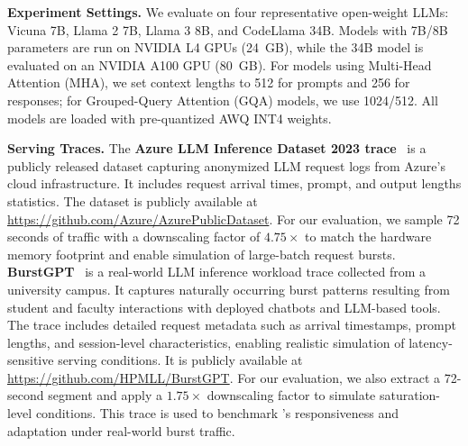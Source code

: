 \noindent\textbf{Experiment Settings.} 
We evaluate {\system} on four representative open-weight LLMs: Vicuna 7B, Llama 2 7B, Llama 3 8B, and CodeLlama 34B. Models with 7B/8B parameters are run on NVIDIA L4 GPUs (24~GB),
while the 34B model is evaluated on an NVIDIA A100 GPU (80~GB). For models using Multi-Head Attention (MHA), we set context lengths to 512 for prompts and 256 for responses; for Grouped-Query Attention (GQA) models, we use 1024/512. All models are loaded with pre-quantized AWQ INT4 weights.

\noindent\textbf{Serving Traces.}
The \textbf{Azure LLM Inference Dataset 2023 trace}~\cite{azure_LLM_inference_trace, patel2024splitwise} is a publicly released dataset capturing anonymized LLM request logs from Azure’s cloud infrastructure. It includes request arrival times, prompt, and output lengths statistics. The dataset is publicly available at \href{https://github.com/Azure/AzurePublicDataset}{\url{https://github.com/Azure/AzurePublicDataset}}. For our evaluation, we sample 72 seconds of traffic with a downscaling factor of $4.75\times$ to match the hardware memory footprint and enable simulation of large-batch request bursts. 
\textbf{BurstGPT}~\cite{wang2024burstgpt} is a real-world LLM inference workload trace collected from a university campus. It captures naturally occurring burst patterns resulting from student and faculty interactions with deployed chatbots and LLM-based tools. The trace includes detailed request metadata such as arrival timestamps, prompt lengths, and session-level characteristics, enabling realistic simulation of latency-sensitive serving conditions. It is publicly available at \href{https://github.com/HPMLL/BurstGPT}{\url{https://github.com/HPMLL/BurstGPT}}. For our evaluation, we also extract a 72-second segment and apply a $1.75\times$ downscaling factor to simulate saturation-level conditions. This trace is used to benchmark {\system}’s responsiveness and adaptation under real-world burst traffic.

